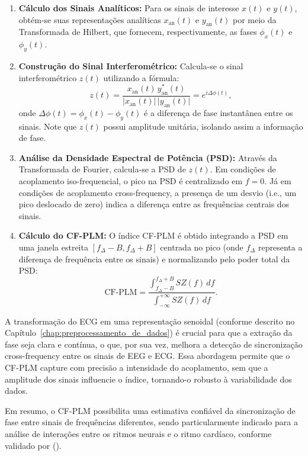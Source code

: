 \begin{enumerate}
    \item \textbf{Cálculo dos Sinais Analíticos:} Para os sinais de interesse \(x(t)\) e \(y(t)\), obtém-se suas representações analíticas \(x_{\mathrm{an}}(t)\) e \(y_{\mathrm{an}}(t)\) por meio da Transformada de Hilbert, que fornecem, respectivamente, as fases \(\phi_x(t)\) e \(\phi_y(t)\).
    \item \textbf{Construção do Sinal Interferométrico:} Calcula-se o sinal interferométrico \(z(t)\) utilizando a fórmula:
    \[
    z(t) = \frac{x_{\mathrm{an}}(t)\, y_{\mathrm{an}}^*(t)}{\lvert x_{\mathrm{an}}(t)\rvert\, \lvert y_{\mathrm{an}}(t)\rvert} = e^{i\Delta \phi(t)},
    \]
    onde \(\Delta \phi(t) = \phi_x(t) - \phi_y(t)\) é a diferença de fase instantânea entre os sinais. Note que \(z(t)\) possui amplitude unitária, isolando assim a informação de fase.
    \item \textbf{Análise da Densidade Espectral de Potência (PSD):} Através da Transformada de Fourier, calcula-se a PSD de \(z(t)\). Em condições de acoplamento iso-frequencial, o pico na PSD é centralizado em \(f = 0\). Já em condições de acoplamento cross-frequency, a presença de um desvio (i.e., um pico deslocado de zero) indica a diferença entre as frequências centrais dos sinais.
    \item \textbf{Cálculo do CF-PLM:} O índice CF-PLM é obtido integrando a PSD em uma janela estreita \([f_\Delta - B, f_\Delta + B]\) centrada no pico (onde \(f_\Delta\) representa a diferença de frequência entre os sinais) e normalizando pelo poder total da PSD:
    \[
    \text{CF-PLM} = \frac{\displaystyle\int_{f_\Delta - B}^{f_\Delta + B} SZ(f) \, df}{\displaystyle\int_{-\infty}^{+\infty} SZ(f) \, df}.
    \]
\end{enumerate}

A transformação do ECG em uma representação senoidal (conforme descrito no Capítulo~\ref{chap:preprocessamento_de_dados}) é crucial para que a extração da fase seja clara e contínua, o que, por sua vez, melhora a detecção de sincronização cross-frequency entre os sinais de EEG e ECG. Essa abordagem permite que o CF-PLM capture com precisão a intensidade do acoplamento, sem que a amplitude dos sinais influencie o índice, tornando-o robusto à variabilidade dos dados.

Em resumo, o CF-PLM possibilita uma estimativa confiável da sincronização de fase entre sinais de frequências diferentes, sendo particularmente indicado para a análise de interações entre os ritmos neurais e o ritmo cardíaco, conforme validado por \citeauthor{sorrentino2022detection} (\citeyear{sorrentino2022detection}).

